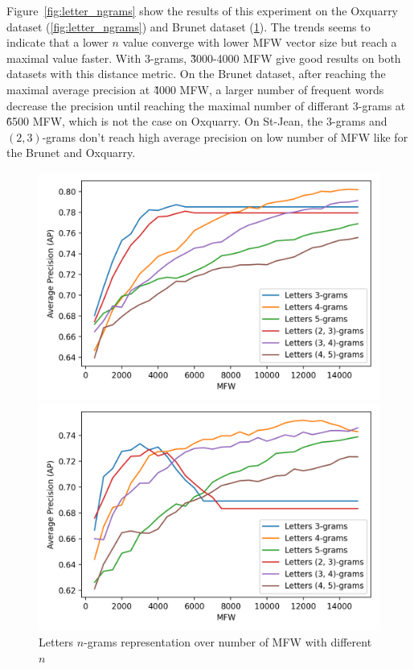 Figure~\ref{fig:letter_ngrams} show the results of this experiment on the Oxquarry dataset (\ref{fig:letter_ngrams}) and Brunet dataset (\ref{fig:letter_ngrams_brunet}).
The trends seems to indicate that a lower $n$ value converge with lower MFW vector size but reach a maximal value faster.
With $3$-grams, \~3000-4000 MFW give good results on both datasets with this distance metric.
On the Brunet dataset, after reaching the maximal average precision at \~4000 MFW, a larger number of frequent words decrease the precision until reaching the maximal number of differant $3$-grams at \~6500 MFW, which is not the case on Oxquarry.
On St-Jean, the $3$-grams and $(2,3)$-grams don't reach high average precision on low number of MFW like for the Brunet and Oxquarry.

\begin{figure}
  \caption{Letters $n$-grams representation over number of MFW with different $n$}
  \label{fig:letter_ngrams}

  \label{fig:letter_ngrams_oxquarry}
  \includegraphics[width=\linewidth]{img/letter_ngrams_oxquarry.png}

  \label{fig:letter_ngrams_brunet}
  \includegraphics[width=\linewidth]{img/letter_ngrams_brunet.png}


\end{figure}
